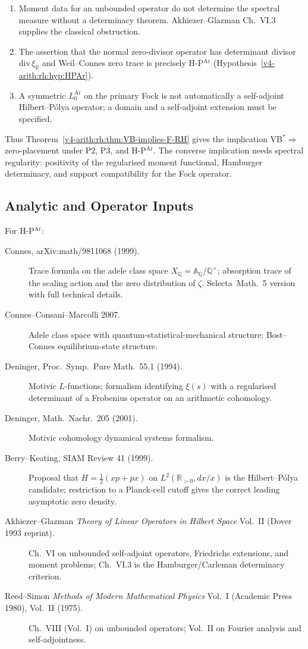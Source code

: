 \begin{enumerate}
\item Moment data for an unbounded operator do not determine the
spectral measure without a determinacy theorem. Akhiezer--Glazman
Ch.~VI.3 supplies the classical obstruction.
\item The assertion that the normal zero-divisor operator has determinant
divisor \(\mathrm{div}\,\xi_{\mathbb R}\) and Weil--Connes zero trace
is precisely H-P\(^{\mathrm{Ar}}\)
(Hypothesis~\ref{v4-arith:rh:hyp:HPAr}).
\item A symmetric \(L_{0}^{\mathrm{Ar}}\) on the primary Fock is not
automatically a self-adjoint Hilbert--P\'olya operator; a domain and a
self-adjoint extension must be specified.
\end{enumerate}

Thus Theorem~\ref{v4-arith:rh:thm:VB-implies-F-RH} gives the implication
VB\(^{*}\Rightarrow\) zero-placement under P2, P3, and
H-P\(^{\mathrm{Ar}}\). The converse implication needs spectral
regularity: positivity of the regularised moment functional,
Hamburger determinacy, and support compatibility for the Fock
operator.

\subsection{Analytic and Operator Inputs}
\label{v4-arith:hpvbconv:sources}

For H-P\(^{\mathrm{Ar}}\):
\begin{description}
\item[Connes, arXiv:math/9811068 (1999).] Trace formula on the adele
class space \(X_{\mathbb{Q}}=\mathbb{A}_{\mathbb{Q}}/\mathbb{Q}^{\times}\);
absorption trace of the scaling action and the zero distribution of
\(\zeta\). Selecta~Math.~5 version with full technical details.
\item[Connes--Consani--Marcolli 2007.] Adele
class space with quantum-statistical-mechanical structure;
Bost--Connes equilibrium-state structure.
\item[Deninger, Proc.~Symp.~Pure Math.~55.1 (1994).] Motivic
\(L\)-functions; formalism identifying \(\xi(s)\) with a regularised
determinant of a Frobenius operator on an arithmetic cohomology.
\item[Deninger, Math.~Nachr.~205 (2001).] Motivic cohomology
dynamical systems formalism.
\item[Berry--Keating, SIAM Review 41 (1999).] Proposal that
\(H=\tfrac{1}{2}(xp+px)\) on \(L^{2}(\mathbb{R}_{>0},dx/x)\) is the
Hilbert--P\'olya candidate; restriction to a Planck-cell cutoff gives the
correct leading asymptotic zero density.
\item[Akhiezer--Glazman \emph{Theory of Linear Operators in Hilbert
Space} Vol.~II (Dover 1993 reprint).] Ch.~VI on unbounded self-adjoint
operators, Friedrichs extensions, and moment problems; Ch.~VI.3 is the
Hamburger/Carleman determinacy criterion.
\item[Reed--Simon \emph{Methods of Modern Mathematical Physics} Vol.~I
(Academic Press 1980), Vol.~II (1975).] Ch.~VIII (Vol.~I) on
unbounded operators; Vol.~II on Fourier analysis and
self-adjointness.
\end{description}

